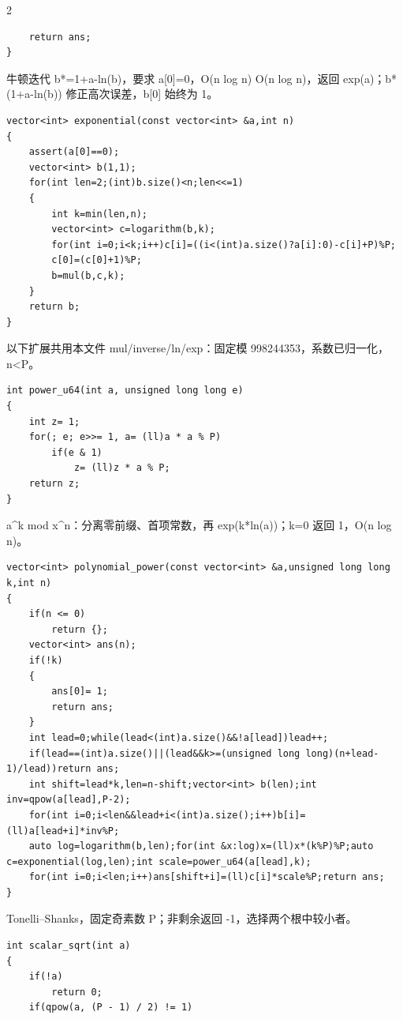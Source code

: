 \documentclass[UTF8,fontset=fandol,a4paper,twoside]{ctexart}
\newcommand{\note}[1]{{\fontsize{10}{12}\selectfont #1\par}}
\begin{document}
\begin{multicols}{2}
\begin{lstlisting}
    return ans;
}
\end{lstlisting}
\note{牛顿迭代 b*=\allowbreak{}1+\allowbreak{}a-\allowbreak{}ln(\allowbreak{}b)\allowbreak{}，要求 a[\allowbreak{}0]\allowbreak{}=\allowbreak{}0，O(\allowbreak{}n log n)\allowbreak{} O(\allowbreak{}n log n)\allowbreak{}，返回 exp(\allowbreak{}a)\allowbreak{}；b*(\allowbreak{}1+\allowbreak{}a-\allowbreak{}ln(\allowbreak{}b)\allowbreak{})\allowbreak{} 修正高次误差，b[\allowbreak{}0]\allowbreak{} 始终为 1。}
\begin{lstlisting}
vector<int> exponential(const vector<int> &a,int n)
{
    assert(a[0]==0);
    vector<int> b(1,1);
    for(int len=2;(int)b.size()<n;len<<=1)
    {
        int k=min(len,n);
        vector<int> c=logarithm(b,k);
        for(int i=0;i<k;i++)c[i]=((i<(int)a.size()?a[i]:0)-c[i]+P)%P;
        c[0]=(c[0]+1)%P;
        b=mul(b,c,k);
    }
    return b;
}
\end{lstlisting}
\note{以下扩展共用本文件 mul/\allowbreak{}inverse/\allowbreak{}ln/\allowbreak{}exp：固定模 998244353，系数已归一化，n<\allowbreak{}P。}
\begin{lstlisting}
int power_u64(int a, unsigned long long e)
{
    int z= 1;
    for(; e; e>>= 1, a= (ll)a * a % P)
        if(e & 1)
            z= (ll)z * a % P;
    return z;
}
\end{lstlisting}
\note{a\textasciicircum{}k mod x\textasciicircum{}n：分离零前缀、首项常数，再 exp(\allowbreak{}k*ln(\allowbreak{}a)\allowbreak{})\allowbreak{}；k=\allowbreak{}0 返回 1，O(\allowbreak{}n log n)\allowbreak{}。}
\begin{lstlisting}
vector<int> polynomial_power(const vector<int> &a,unsigned long long k,int n)
{
    if(n <= 0)
        return {};
    vector<int> ans(n);
    if(!k)
    {
        ans[0]= 1;
        return ans;
    }
    int lead=0;while(lead<(int)a.size()&&!a[lead])lead++;
    if(lead==(int)a.size()||(lead&&k>=(unsigned long long)(n+lead-1)/lead))return ans;
    int shift=lead*k,len=n-shift;vector<int> b(len);int inv=qpow(a[lead],P-2);
    for(int i=0;i<len&&lead+i<(int)a.size();i++)b[i]=(ll)a[lead+i]*inv%P;
    auto log=logarithm(b,len);for(int &x:log)x=(ll)x*(k%P)%P;auto c=exponential(log,len);int scale=power_u64(a[lead],k);
    for(int i=0;i<len;i++)ans[shift+i]=(ll)c[i]*scale%P;return ans;
}
\end{lstlisting}
\note{Tonelli–Shanks，固定奇素数 P；非剩余返回 -\allowbreak{}1，选择两个根中较小者。}
\begin{lstlisting}
int scalar_sqrt(int a)
{
    if(!a)
        return 0;
    if(qpow(a, (P - 1) / 2) != 1)

\end{lstlisting}
\end{multicols}
\end{document}

